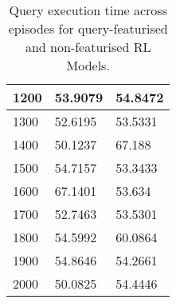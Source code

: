 \begin{table}[ht]
\begin{tabular}{|l|l|l|}
1200             & 53.9079                                                                            & 54.8472                                                                              \\ \hline
1300             & 52.6195                                                                            & 53.5331                                                                              \\ \hline
1400             & 50.1237                                                                            & 67.188                                                                               \\ \hline
1500             & 54.7157                                                                            & 53.3433                                                                              \\ \hline
1600             & 67.1401                                                                            & 53.634                                                                               \\ \hline
1700             & 52.7463                                                                            & 53.5301                                                                              \\ \hline
1800             & 54.5992                                                                            & 60.0864                                                                              \\ \hline
1900             & 54.8646                                                                            & 54.2661                                                                              \\ \hline
2000             & 50.0825                                                                            & 54.4446                                                                              \\ \hline
\end{tabular}
    \caption{Query execution time across episodes for query-featurised and non-featurised RL Models.}
    \label{tab:model-convergence}
\end{table}
